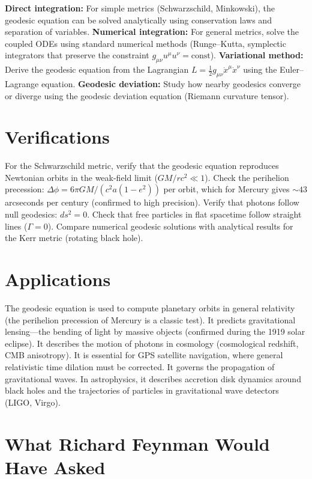 \documentclass[11pt,openright]{book}
\begin{document}
\textbf{Direct integration:} For simple metrics (Schwarzschild, Minkowski), the geodesic equation can be solved analytically using conservation laws and separation of variables. \textbf{Numerical integration:} For general metrics, solve the coupled ODEs using standard numerical methods (Runge--Kutta, symplectic integrators that preserve the constraint $g_{\mu\nu}u^\mu u^\nu = \text{const}$). \textbf{Variational method:} Derive the geodesic equation from the Lagrangian $L = \frac{1}{2}g_{\mu\nu}\dot{x}^\mu\dot{x}^\nu$ using the Euler--Lagrange equation. \textbf{Geodesic deviation:} Study how nearby geodesics converge or diverge using the geodesic deviation equation (Riemann curvature tensor).
\section*{Verifications}

For the Schwarzschild metric, verify that the geodesic equation reproduces Newtonian orbits in the weak-field limit ($GM/rc^2 \ll 1$). Check the perihelion precession: $\Delta\phi = 6\pi GM/(c^2 a(1-e^2))$ per orbit, which for Mercury gives $\sim 43$ arcseconds per century (confirmed to high precision). Verify that photons follow null geodesics: $ds^2 = 0$. Check that free particles in flat spacetime follow straight lines ($\Gamma = 0$). Compare numerical geodesic solutions with analytical results for the Kerr metric (rotating black hole).
\section*{Applications}

The geodesic equation is used to compute planetary orbits in general relativity (the perihelion precession of Mercury is a classic test). It predicts gravitational lensing---the bending of light by massive objects (confirmed during the 1919 solar eclipse). It describes the motion of photons in cosmology (cosmological redshift, CMB anisotropy). It is essential for GPS satellite navigation, where general relativistic time dilation must be corrected. It governs the propagation of gravitational waves. In astrophysics, it describes accretion disk dynamics around black holes and the trajectories of particles in gravitational wave detectors (LIGO, Virgo).
\section*{What Richard Feynman Would Have Asked}
\end{document}
